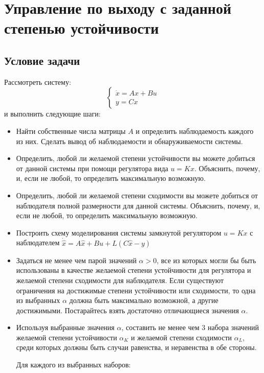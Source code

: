 \chapter{Управление по выходу с заданной степенью устойчивости}
\label{ch:chap2}
\section{Условие задачи}

Рассмотреть систему:
$$
  \begin{cases}
    \dot{x} = Ax + Bu \\
    y = Cx
  \end{cases}
$$ и выполнить следующие шаги:

\begin{itemize}
    \item  Найти собственные числа матрицы $A$ и определить наблюдаемость каждого из них. 
    Сделать вывод об наблюдаемости и обнаруживаемости системы.
    \item Определить, любой ли желаемой степени устойчивости вы можете добиться от
данной системы при помощи регулятора вида $u = Kx$. Объяснить, почему, и, если не любой, то определить максимальную возможную.
    \item  Определить, любой ли желаемой степени сходимости вы можете добиться от наблюдателя 
    полной размерности для данной системы. Объяснить, почему, и, если не любой, то определить максимальную возможную.
  \item Построить схему моделирования системы замкнутой регулятором $u = Kx$ с наблюдателем $\dot{\hat{x}} = A\hat{x} + Bu + L(C\hat{x} - y)$
  \item Задаться не менее чем парой значений $\alpha > 0$, все из которых могли бы быть
  использованы в качестве желаемой степени устойчивости для регулятора и желаемой 
  степени сходимости для наблюдателя. Если существуют ограничения на достижимые 
  степени устойчивости или сходимости, то одна из выбранных $\alpha$ должна
  быть максимально возможной, а другие достижимыми. Постарайтесь взять достаточно 
  отличающиеся значения $\alpha$.
\item Используя выбранные значения $\alpha$, составить не менее чем 
3 набора значений желаемой степени устойчивости $\alpha_K$ и желаемой степени сходимости $\alpha_L$, 
среди которых должны быть случаи равенства, и неравенства в обе стороны.

Для каждого из выбранных наборов:


\end{itemize}
